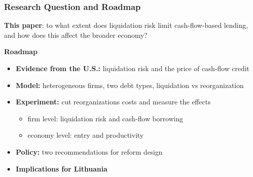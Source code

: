 \documentclass[aspectratio=169,xcolor=table]{beamer}
\begin{document}
\begin{frame}[label=roadmap] \frametitle{Research Question and Roadmap}

\textbf{This paper}: to what extent does liquidation risk limit cash-flow-based lending, and how does this affect the broader economy? \vspace{3mm}

\pause

\textbf{Roadmap}
\begin{itemize}
    \item[1.] \textbf{Evidence from the U.S.:} liquidation risk and the price of cash-flow credit
    \item[2.] \textbf{Model:} heterogeneous firms, two debt types, liquidation vs reorganization \vspace{2mm}
    \item[3.] \textbf{Experiment:} cut reorganizations costs and measure the effects
    \begin{itemize} \small
        \item firm level: liquidation risk and cash-flow borrowing
        \item economy level: entry and productivity
    \end{itemize} \vspace{2mm}
    \item[4.] \textbf{Policy:} two recommendations for reform design
    \item[5.] \textbf{Implications for Lithuania}
\end{itemize}

\end{frame}
\end{document}
